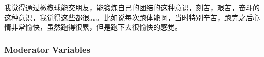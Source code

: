 \begin{CJK}{UTF8}{gbsn}
我觉得通过橄榄球能交朋友，能锻炼自己的团结的这种意识，刻苦，艰苦，奋斗的这种意识，我觉得这些都很。。。比如说每次跑体能啊，当时特别辛苦，跑完之后心情非常愉快，虽然跑得很累，但是跑下去很愉快的感觉。 











\subsubsection{Moderator Variables}









                                                          \end{CJK}
